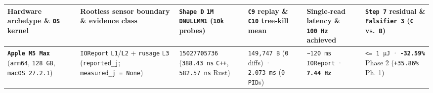 \documentclass[10pt,letterpaper]{article}
\begin{document}
{\scriptsize\setlength{\tabcolsep}{3.0pt}\renewcommand{\arraystretch}{1.14}
\begin{longtable}[]{@{}
  >{\raggedright\arraybackslash}p{}
  >{\raggedright\arraybackslash}p{}
  >{\raggedright\arraybackslash}p{}
  >{\raggedright\arraybackslash}p{}
  >{\raggedright\arraybackslash}p{}
  >{\raggedright\arraybackslash}p{}@{}}
\toprule\noalign{}
\begin{minipage}[b]{\linewidth}\raggedright
\textbf{Hardware archetype \& \texttt{OS} kernel}
\end{minipage} & \begin{minipage}[b]{\linewidth}\raggedright
\textbf{Rootless sensor boundary \& evidence class}
\end{minipage} & \begin{minipage}[b]{\linewidth}\raggedright
\textbf{\texttt{Shape\ D} \texttt{1M} \texttt{DNULLMM1} (\texttt{10k}
probes)}
\end{minipage} & \begin{minipage}[b]{\linewidth}\raggedright
\textbf{\texttt{C9} replay \& \texttt{C10} tree-kill mean}
\end{minipage} & \begin{minipage}[b]{\linewidth}\raggedright
\textbf{Single-read latency \& \texttt{100\ Hz} achieved}
\end{minipage} & \begin{minipage}[b]{\linewidth}\raggedright
\textbf{\texttt{Step\ 7} residual \& \texttt{Falsifier\ 3} (\texttt{C}
vs.~\texttt{B})}
\end{minipage} \\
\midrule\noalign{}
\endhead
\bottomrule\noalign{}
\endlastfoot
\textbf{\texttt{Apple\ M5\ Max}} (\texttt{arm64}, \texttt{128\ GB},
\texttt{macOS\ 27.\allowbreak{}2.\allowbreak{}1}) & \texttt{IOReport} \texttt{L1}/\allowbreak{}\texttt{L2} +
\texttt{rusage} \texttt{L3} (\texttt{reported\_\allowbreak{}j};
\texttt{measured\_\allowbreak{}j\ =\ None}) & \texttt{15027705736}
(\texttt{388.\allowbreak{}43\ ns} \texttt{C++}, \texttt{582.\allowbreak{}57\ ns} Rust) &
\texttt{149,\allowbreak{}747\ B} (\texttt{0} diffs) · \texttt{2.073\ ms} (\texttt{0}
\texttt{PID}s) & \texttt{\textasciitilde{}120\ ms} \texttt{IOReport} ·
\textbf{\texttt{7.44\ Hz}} & \texttt{\textless{}=\ 1\ µJ} ·
\textbf{\texttt{-32.59\%}} Phase 2 (\texttt{+35.86\%} Ph. 1) \\

\end{longtable}}
\end{document}
